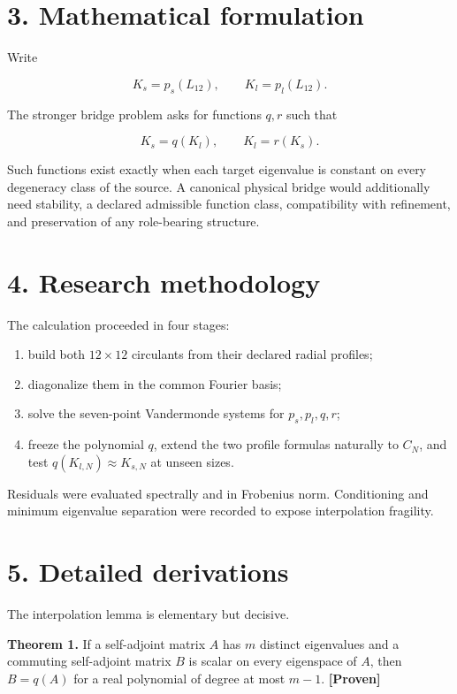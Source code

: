 \documentclass[11pt,a4paper,openany]{report}
\newcommand{\statusProven}{\textcolor{fingreen}{[Proven]}}
\begin{document}
\section{3. Mathematical formulation}

Write

\[
K_s=p_s(L_{12}),\qquad K_l=p_l(L_{12}).
\]

The stronger bridge problem asks for functions \(q,r\) such that

\[
K_s=q(K_l),\qquad K_l=r(K_s).
\]

Such functions exist exactly when each target eigenvalue is constant on every degeneracy class of the source. A canonical physical bridge would additionally need stability, a declared admissible function class, compatibility with refinement, and preservation of any role-bearing structure.

\section{4. Research methodology}

The calculation proceeded in four stages:

\begin{enumerate}
\item 
build both \(12\times12\) circulants from their declared radial profiles;

\item 
diagonalize them in the common Fourier basis;

\item 
solve the seven-point Vandermonde systems for \(p_s,p_l,q,r\);

\item 
freeze the polynomial \(q\), extend the two profile formulas naturally to \(C_N\), and test \(q(K_{l,N})\approx K_{s,N}\) at unseen sizes.

\end{enumerate}

Residuals were evaluated spectrally and in Frobenius norm. Conditioning and minimum eigenvalue separation were recorded to expose interpolation fragility.

\section{5. Detailed derivations}

The interpolation lemma is elementary but decisive.

\textbf{Theorem 1.} If a self-adjoint matrix \(A\) has \(m\) distinct eigenvalues and a commuting self-adjoint matrix \(B\) is scalar on every eigenspace of \(A\), then \(B=q(A)\) for a real polynomial of degree at most \(m-1\). \textbf{\statusProven{}}
\end{document}
